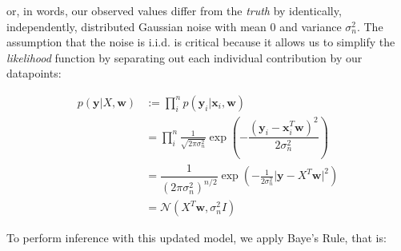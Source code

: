 or, in words, our observed values differ from the \textit{truth} by identically, independently, distributed Gaussian noise with mean $0$ and variance $\sigma_n^2$. The assumption that the noise is i.i.d. is critical because it allows us to simplify the \textit{likelihood} function by separating out each individual contribution by our datapoints:

\begin{align}
    p(\mathbf{y}\vert X,\mathbf{w}) &:= \prod\limits_i^n p(\mathbf{y}_i \vert \mathbf{x}_i, \mathbf{w}) \\
    &= \prod\limits_i^n \frac{1}{\sqrt{2\pi\sigma_n^2}}\exp\left( -\dfrac{(\mathbf{y}_i-\mathbf{x}_i^T\mathbf{w})^2}{2\sigma_n^2}\right)\\
    &= \dfrac{1}{(2\pi\sigma_n^2)^{n/2}}\exp\left( -\frac{1}{2\sigma_n^2}\lvert \mathbf{y} - X^T\mathbf{w}\rvert^2 \right) \\
    &= \mathcal{N}\left(X^T\mathbf{w}, \sigma_n^2I\right)
\end{align}

To perform inference with this updated model, we apply Baye's Rule, that is:



